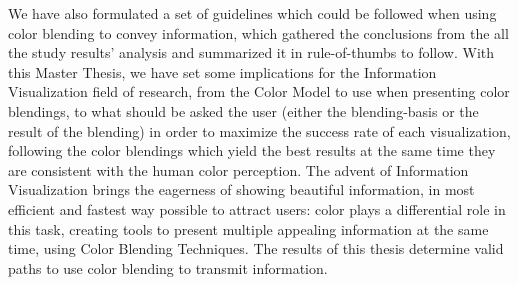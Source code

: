 %
We have also formulated a set of guidelines which could be followed when using color blending to convey information, which gathered the conclusions
from the all the study results' analysis and summarized it in rule-of-thumbs to follow.
With this Master Thesis, we have set some implications for the Information Visualization field of research, from the Color Model to use when presenting
color blendings, to what should be asked the user (either the blending-basis or the result of the blending) in order to maximize the success rate of
each visualization, following the color blendings which yield the best results at the same time they are consistent with the human color perception.
%
The advent of Information Visualization brings the eagerness of showing beautiful information, in most efficient and fastest way possible to attract
users: color plays a differential role in this task, creating tools to present multiple appealing information at the same time, using Color Blending
Techniques. The results of this thesis determine valid paths to use color blending to transmit information.
%

